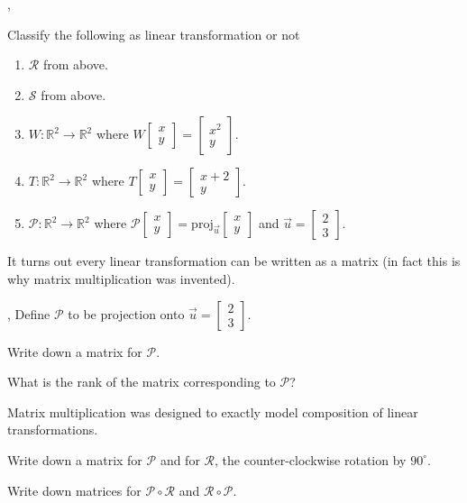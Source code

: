 \documentclass[letter]{article}
\newcommand{\R}{\mathbb{R}}
\newcommand{\proj}{\mathrm{proj}}
\newcommand{\Null}{\mathrm{null}\,}
\newcommand{\Range}{\mathrm{range}\,}
\newcommand{\mat}[1]{\begin{bmatrix}#1\end{bmatrix}}
\renewcommand{\emph}[1]{{\color{defcolor} \textbf{\textit{##1}}}}
\begin{document}
\sep
\vspace{-.8cm}
\begin{Enum}
	\item Classify the following as linear transformation or not
		\begin{enumerate}
			\item $\mathcal R$ from above.
			\item $\mathcal S$ from above.
			\item $W:\R^2\to\R^2$ where $W\mat{x\\y}=\mat{x^2\\y}$.
			\item $T:\R^2\to\R^2$ where $T\mat{x\\y}=\mat{x+2\\y}$.
			\item $\mathcal P:\R^2\to\R^2$ where $\mathcal P\mat{x\\y}=\proj_{\vec u}\mat{x\\y}$ and 
				$\vec u=\mat{2\\3}$.
		\end{enumerate}
\end{Enum}

\vspace{-.2cm}
It turns out every linear transformation can be written as a matrix (in fact
this is why matrix multiplication was invented).

\sep
Define $\mathcal P$ to be projection onto $\vec u=\mat{2\\3}$.
\begin{Enum}
	\item Write down a matrix for $\mathcal P$.
	\item What is the rank of the matrix corresponding to $\mathcal P$?
\end{Enum}

Matrix multiplication was designed to exactly model composition of linear transformations.
\begin{Enum}[resume]
	\item Write down a matrix for $\mathcal P$ and for $\mathcal R$, the counter-clockwise rotation
		by $90^\circ$.
	\item Write down matrices for $\mathcal P\circ\mathcal R$ and $\mathcal R\circ \mathcal P$.
\end{Enum}

\vspace{-.8cm}
\vspace{-.4cm}
\end{document}
